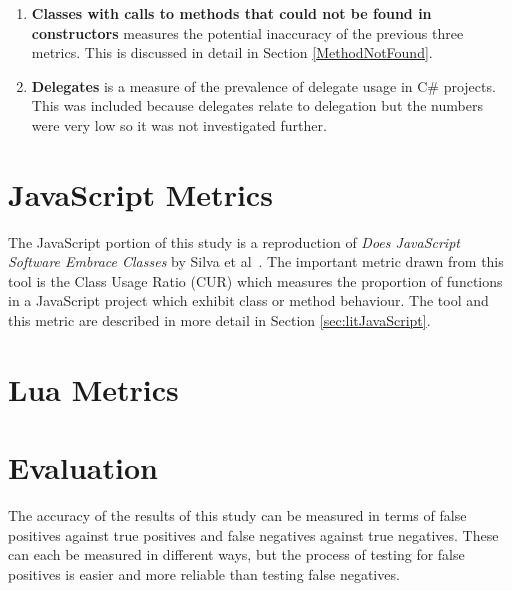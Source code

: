 \begin{enumerate}
	\item \textbf{Classes with calls to methods that could not be found in constructors} measures the potential inaccuracy of the previous three metrics. This is discussed in detail in Section \ref{MethodNotFound}.
		
	\item \textbf{Delegates} is a measure of the prevalence of delegate usage in C\# projects. This was included because delegates relate to delegation but the numbers were very low so it was not investigated further.
\end{enumerate}

\section{JavaScript Metrics}
The JavaScript portion of this study is a reproduction of \textit{Does JavaScript Software Embrace Classes} by Silva et al~\cite{JSClassFinder}. The important metric drawn from this tool is the Class Usage Ratio (CUR) which measures the proportion of functions in a JavaScript project which exhibit class or method behaviour. The tool and this metric are described in more detail in Section \ref{sec:litJavaScript}.

\section{Lua Metrics}


\section{Evaluation}
The accuracy of the results of this study can be measured in terms of false positives against true positives and false negatives against true negatives. These can each be measured in different ways, but the process of testing for false positives is easier and more reliable than testing false negatives.

